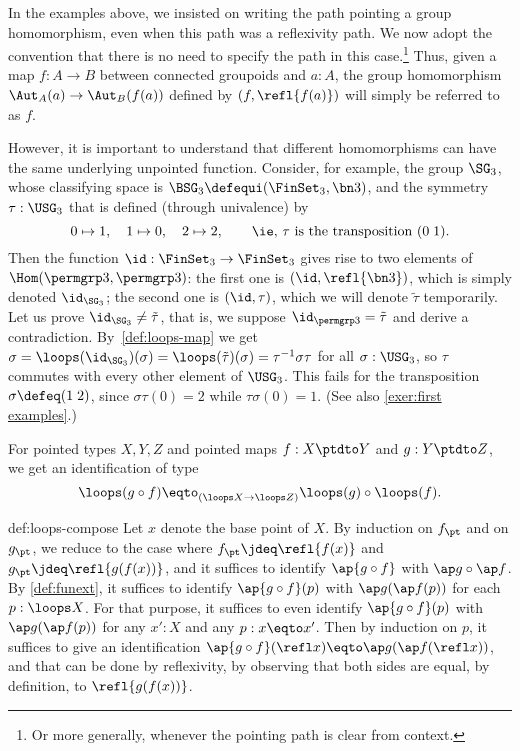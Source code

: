 \begin{remark}
  In the examples above, we insisted on writing the path pointing a group
  homomorphism, even when this path was a reflexivity path. We now adopt
  the convention that there is no need to specify the path in this case.\footnote{%
    Or more generally, whenever the pointing path is clear from context.}
  Thus, given a
  map $f:A \to B$ between connected groupoids and $a:A$, the group
  homomorphism $\Aut_A(a) \to \Aut_B(f(a))$ defined by
  $(f,\refl{f(a)})$ will simply be referred to as $f$.

  However, it is important to understand that different homomorphisms
  can have the same underlying unpointed function. Consider, for
  example, the group $\SG_3$, whose classifying space is
  $\BSG_3\defequi (\FinSet_3,\bn 3)$, and the symmetry
  $\tau:\USG_3$ that is defined (through
  univalence) by
  \[
    0\mapsto 1,\quad 1\mapsto 0,\quad 2 \mapsto 2, \qquad
    \text{\ie, $\tau$ is the transposition $(0\; 1)$.}
  \]
  Then the function $\id: \FinSet_3 \to \FinSet_3$ gives rise to two
  elements of $\Hom(\permgrp 3,\permgrp 3)$: the first one is
  $(\id,\refl{\bn 3})$, which is simply denoted $\id_{\SG_3}$;
  the second one is $(\id,\tau)$, which we will denote $\tilde\tau$
  temporarily. Let us prove $\id_{\SG_3} \neq \tilde \tau$, that
  is, we suppose $\id_{\permgrp 3} = \tilde \tau$
  and derive a
  contradiction. By~\cref{def:loops-map} we get
  $\sigma = \loops(\id_{\SG_3})(\sigma) = \loops(\tilde \tau)(\sigma) 
          = \tau^{-1} \sigma \tau$ for all $\sigma : \USG_3$,
  so $\tau$ commutes with every other element of
  $\USG_3$. This fails for the transposition $\sigma \defeq (1\;2)$,
  since $\sigma\tau(0) = 2$ while $\tau\sigma(0) = 1$. (See also
  \cref{exer:first examples}.)
\end{remark}

\begin{construction}\label{def:loops-compose}
  For pointed types $X,Y,Z$ and pointed maps $f : X \ptdto Y$
  and $g : Y \ptdto Z$, we get an identification of type
  \[
    \loops(g \circ f) \eqto_{(\loops X \to \loops Z)}
    \loops(g) \circ \loops(f).
  \]
\end{construction}

\begin{implementation}{def:loops-compose}
  Let $x$ denote the base point of $X$.
  By induction on $f_\pt$ and on $g_\pt$, we reduce to the case where $f_\pt \jdeq \refl{f(x)}$
  and $g_\pt \jdeq \refl{g(f(x))}$, and it suffices to identify $\ap{g \circ f}$ with $\ap g \circ \ap f$.
  By \cref{def:funext}, it suffices to identify $\ap{g \circ f}(p)$ with $\ap g ( \ap f (p))$ for each $p : \loops X$.
  For that purpose, it suffices to even identify $\ap{g \circ f}(p)$ with $\ap g ( \ap f (p))$ for any $x' : X$ and any $p : x \eqto x'$.
  Then by induction on $p$, it suffices to give an identification
  $\ap{g \circ f}(\refl x) \eqto \ap g ( \ap f (\refl x))$, and that can
  be done by reflexivity,
  by observing that both sides are equal, by definition, to $\refl{g(f(x))}$.
\end{implementation}

